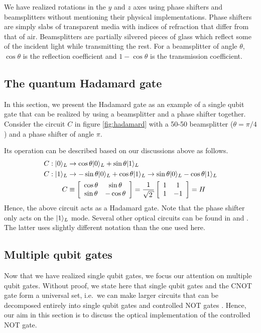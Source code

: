 We have realized rotations in the $y$ and $z$ axes using phase shifters and beamsplitters without mentioning their physical implementations. Phase shifters are simply slabs of transparent media with indices of refraction that differ from that of air. Beamsplitters are partially silvered pieces of glass which reflect some of the incident light while transmitting the rest. For a beamsplitter of angle $\theta$, $\cos\theta$ is the reflection coefficient and $1-\cos\theta$ is the transmission coefficient.

\subsection{The quantum Hadamard gate\label{sec:hadamard}}
In this section, we present the Hadamard gate as an example of a single qubit gate that can be realized by using a beamsplitter and a phase shifter together. Consider the circuit $C$ in figure \ref{fig:hadamard} with a 50-50 beamsplitter ($\theta = \pi/4$) and a phase shifter of angle $\pi$.


Its operation can be described based on our discussions above as follows.
\begin{align}
C:\ket{0}_L &\rightarrow \cos\theta\ket{0}_L + \sin\theta\ket{1}_L\\
C:\ket{1}_L &\rightarrow -\sin\theta\ket{0}_L + \cos\theta\ket{1}_L \rightarrow \sin\theta\ket{0}_L - \cos\theta\ket{1}_L\\
C&\equiv \left[\begin{array}{cc}\cos\theta & \sin\theta\\
\sin\theta & -\cos\theta\end{array}\right] = \frac{1}{\sqrt{2}}\left[\begin{array}{cc}1 & 1\\
1 & -1\end{array}\right] = H
\end{align}
Hence, the above circuit acts as a Hadamard gate. Note that the phase shifter only acts on the $|1\rangle_L$ mode. Several other optical circuits can be found in \cite{nielsen2000} and \cite{klm}. The latter uses slightly different notation than the one used here.

\subsection{Multiple qubit gates}
Now that we have realized single qubit gates, we focus our attention on multiple qubit gates. Without proof, we state here that single qubit gates and the CNOT gate form a universal set, i.e.\ we can make larger circuits that can be decomposed entirely into single qubit gates and controlled NOT gates \cite{klm}. Hence, our aim in this section is to discuss the optical implementation of the controlled NOT gate.

